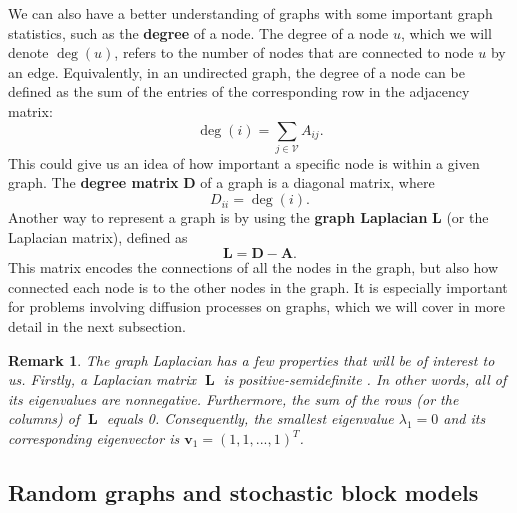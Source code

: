 \documentclass[12pt, oneside]{report}   	%
\newtheorem{rmk}{Remark}
\DeclareMathOperator{\Lplc}{\boldsymbol{L}}
\begin{document}
We can also have a better understanding of graphs with some important graph statistics, such as the \textbf{degree} of a node. The degree of a node $u$, which we will denote $\deg(u)$, refers to the number of nodes that are connected to node $u$ by an edge. Equivalently, in an undirected graph, the degree of a node can be defined as the sum of the entries of the corresponding row in the adjacency matrix:
$$
\deg(i)=\sum_{j\in\mathcal{V}} A_{ij}.
$$
This could give us an idea of how important a specific node is within a given graph. The \textbf{degree matrix} $\boldsymbol{D}$ of a graph is a diagonal matrix, where 
\begin{equation}
\label{eq:degree}
D_{ii}=\deg(i).
\end{equation}
\noindent Another way to represent a graph is by using the \textbf{graph Laplacian} $\boldsymbol{L}$ (or the Laplacian matrix), defined as
\begin{equation}
\boldsymbol{L}=\boldsymbol{D}-\boldsymbol{A}.
\end{equation} 
This matrix encodes the connections of all the nodes in the graph, but also how connected each node is to the other nodes in the graph. It is especially important for problems involving diffusion processes on graphs, which we will cover in more detail in the next subsection. 
\begin{rmk}
\label{rmk:lplc_properties}
The graph Laplacian has a few properties that will be of interest to us. Firstly, a Laplacian matrix $\Lplc$ is positive-semidefinite \cite{Newman2010}. In other words, all of its eigenvalues are nonnegative. Furthermore, the sum of the rows (or the columns) of $\Lplc$ equals 0. Consequently, the smallest eigenvalue $\lambda_1=0$ and its corresponding eigenvector is $\boldsymbol{v}_1=(1,1,...,1)^T$.
\end{rmk}

\subsection{Random graphs and stochastic block models}
\end{document}

